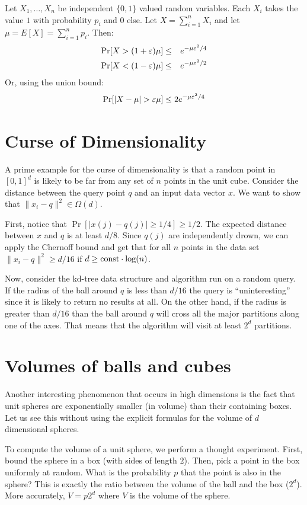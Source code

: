 \documentclass{article}
\begin{document}
\begin{theorem}
Let $X_1,\ldots,X_n$ be independent
$\{0,1\}$ valued random variables. Each $X_i$ takes the value $1$
with probability $p_i$ and $0$ else. Let $X = \sum_{i=1}^{n}X_i$ and
let $\mu = E[X] = \sum_{i=1}^{n}p_i$. Then:
\begin{eqnarray*}
\Pr[X > (1+\varepsilon)\mu] &\le& e^{-\mu \varepsilon^2/4}\\
\Pr[X < (1-\varepsilon)\mu] &\le& e^{-\mu \varepsilon^2/2}
\end{eqnarray*}
Or, using the union bound:
\[
\Pr[|X - \mu| > \varepsilon\mu] \le 2e^{-\mu \varepsilon^2/4}
\]
\end{theorem}




\section{Curse of Dimensionality}
A prime example for the curse of dimensionality is that a random point in $[0,1]^d$ is likely to be far from any set of $n$ points in the unit cube.
Consider the distance between the query point $q$ and an input data vector $x$.
We want to show that $\|x_i-q\|^2 \in \Omega(d)$.

First, notice that $\Pr[|x(j)- q(j)| \ge 1/4] \ge 1/2$. The expected distance between $x$ and $q$ is at least $d/8$.
Since $q(j)$ are independently drown, we can apply the Chernoff bound and get that for all $n$ points in the data set
$\|x_i-q\|^2 \ge d/16$ if $d \ge {\operatorname{const}}\cdot\log(n)$.

Now, consider the kd-tree data structure and algorithm run on a random query.
If the radius of the ball around $q$ is less than $d/16$ the query is ``uninteresting'' since it is likely to return no results at all.
On the other hand, if the radius is greater than $d/16$ than the ball around $q$ will cross all the major partitions 
along one of the axes. That means that the algorithm will visit at least $2^d$ partitions.


\section{Volumes of balls and cubes}
Another interesting phenomenon that occurs in high dimensions is the fact that unit spheres 
are exponentially smaller (in volume) than their containing boxes.
Let us see this without using the explicit formulas for the volume of $d$ dimensional spheres.

To compute the volume of a unit sphere, we perform a thought experiment.
First, bound the sphere in a box (with sides of length $2$).
Then, pick a point in the box uniformly at random. What is the probability $p$ that
the point is also in the sphere? This is exactly the ratio between the volume of the ball and the box ($2^d$).
More accurately, $V = p2^d$ where $V$ is the volume of the sphere.
\end{document}
